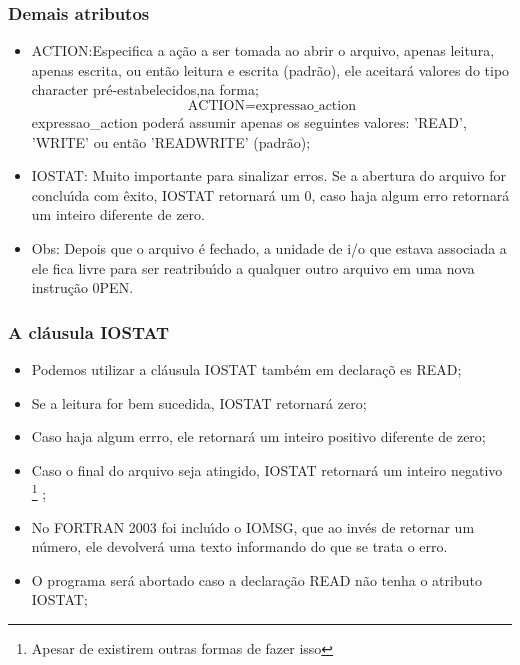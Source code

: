 \documentclass[notes=show]{beamer}
\begin{document}
\begin{frame}%
\frametitle{Demais atributos}
\begin{itemize}
\item ACTION:Especifica a a\c{c}\~{a}o a ser tomada ao abrir o arquivo,
apenas leitura, apenas escrita, ou ent\~{a}o leitura e escrita (padr\~{a}o),
ele aceitar\'{a} valores do tipo character pr\'{e}-estabelecidos,na forma;%
\[
\text{ACTION=expressao\_action}
\]%
expressao\_action poder\'{a} assumir apenas os seguintes valores: 'READ',
'WRITE' ou ent\~{a}o 'READWRITE' (padr\~{a}o);

\item IOSTAT: Muito importante para sinalizar erros. Se a abertura do
arquivo for conclu\'{\i}da com \^{e}xito, IOSTAT retornar\'{a} um 0, caso
haja algum erro retornar\'{a} um inteiro diferente de zero.

\item Obs: Depois que o arquivo \'{e} fechado, a unidade de i/o que estava
associada a ele fica livre para ser reatribu\'{\i}do a qualquer outro
arquivo em uma nova instru\c{c}\~{a}o 0PEN.
\end{itemize}

\end{frame}%

\begin{frame}%

\frametitle{A cl\'{a}usula IOSTAT}

\begin{itemize}
\item Podemos utilizar a cl\'{a}usula IOSTAT tamb\'{e}m em declara\c{c}\~{o}%
es READ;

\item Se a leitura for bem sucedida, IOSTAT retornar\'{a} zero;

\item Caso haja algum errro, ele retornar\'{a} um inteiro positivo diferente de zero;

\item Caso o final do arquivo seja atingido, IOSTAT retornar\'{a} um inteiro
negativo%
\footnote{Apesar de existirem outras formas de fazer isso}%
;

\item No FORTRAN 2003 foi inclu\'{\i}do o IOMSG, que ao invés de retornar um número, ele devolverá uma texto informando do que se trata o erro.

\item O programa ser\'{a} abortado caso a declara\c{c}\~{a}o READ n\~{a}o
tenha o atributo IOSTAT;
\end{itemize}

\end{frame}%
\end{document}

